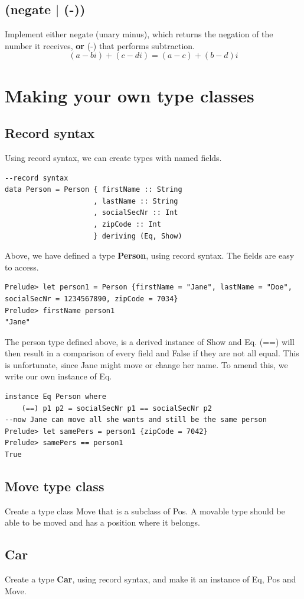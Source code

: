 \documentclass{article}
\begin{document}
\subsection{(negate $|$ (-))}
Implement either negate (unary minus), which returns the negation of the number it receives, \textbf{or} (-) that performs subtraction.
\[(a-bi)+(c-di)=(a-c)+(b-d)i\]

\section{Making your own type classes}

\subsection{Record syntax}
Using record syntax, we can create types with named fields.
\begin{lstlisting}
--record syntax
data Person = Person { firstName :: String
                     , lastName :: String
                     , socialSecNr :: Int
                     , zipCode :: Int
                     } deriving (Eq, Show)
\end{lstlisting}
Above, we have defined a type \textbf{Person}, using record syntax. The fields are easy to access.
\begin{lstlisting}
Prelude> let person1 = Person {firstName = "Jane", lastName = "Doe", socialSecNr = 1234567890, zipCode = 7034}
Prelude> firstName person1
"Jane"
\end{lstlisting}
The person type defined above, is a derived instance of Show and Eq. (==) will then result in a comparison of every field and False if they are not all equal. This is unfortunate, since Jane might move or change her name. To amend this, we write our own instance of Eq.
\begin{lstlisting}
instance Eq Person where
    (==) p1 p2 = socialSecNr p1 == socialSecNr p2
--now Jane can move all she wants and still be the same person
Prelude> let samePers = person1 {zipCode = 7042}
Prelude> samePers == person1
True
\end{lstlisting}
\subsection{Move type class}
Create a type class Move that is a subclass of Pos. A movable type should be able to be moved and has a position where it belongs.

\subsection{Car}
Create a type \textbf{Car}, using record syntax, and make it an instance of Eq, Pos and Move.
\end{document}
